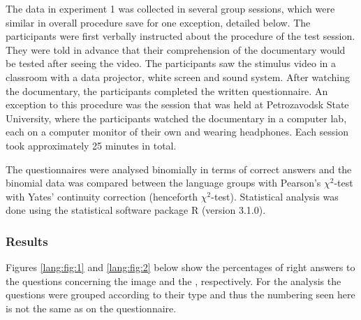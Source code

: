 \documentclass[output=paper]{langsci/langscibook}
\begin{document}
The data in experiment 1 was collected in several group sessions, which were similar in overall procedure save for one exception, detailed below. The participants were first verbally instructed about the procedure of the test session. They were told in advance that their comprehension of the documentary would be tested after seeing the video. The participants saw the stimulus video in a classroom with a data projector, white screen and sound system. After watching the documentary, the participants completed the written questionnaire. An exception to this procedure was the session that was held at Petrozavodsk State University, where the participants watched the documentary in a computer lab, each on a computer monitor of their own and wearing headphones. Each session took approximately 25 minutes in total.

The questionnaires were analysed binomially in terms of correct answers and the binomial data was compared between the language groups with Pearson's ${\chi}^2$-test with Yates' continuity correction (henceforth ${\chi}^2$-test). Statistical analysis was done using the statistical software package R (version 3.1.0).

\subsubsection{Results}

Figures \ref{lang:fig:1} and \ref{lang:fig:2} below show the percentages of right answers to the questions concerning the image and the , respectively. For the analysis the questions were grouped according to their type and thus the numbering seen here is not the same as on the questionnaire. 
\end{document}
